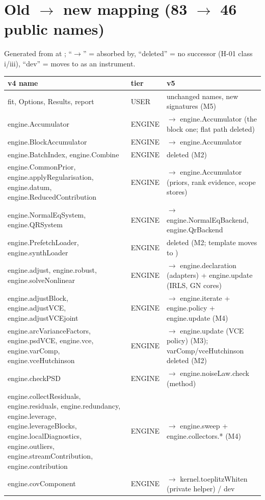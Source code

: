 \appendix
\chapter{Old $\to$ new mapping (83 $\to$ 46 public names)}
\label{app:mapping}

Generated from  at ; ``$\to$'' = absorbed by, ``deleted'' = no successor (H-01 class i/iii), ``dev'' = moves to  as an instrument.

\begin{longtable}{@{}P{72mm}P{14mm}P{68mm}@{}}
\toprule
v4 name & tier & v5\\
\midrule
fit, Options, Results, report & USER & unchanged names, new signatures (M5)\\
engine.Accumulator & ENGINE & $\to$ engine.Accumulator (the block one; flat path deleted)\\
engine.BlockAccumulator & ENGINE & $\to$ engine.Accumulator\\
engine.BatchIndex, engine.Combine & ENGINE & deleted (M2)\\
engine.CommonPrior, engine.applyRegularisation, engine.datum, engine.ReducedContribution & ENGINE & $\to$ engine.Accumulator (priors, rank evidence, scope stores)\\
engine.NormalEqSystem, engine.QRSystem & ENGINE & $\to$ engine.NormalEqBackend, engine.QrBackend\\
engine.PrefetchLoader, engine.synthLoader & ENGINE & deleted (M2; template moves to )\\
engine.adjust, engine.robust, engine.solveNonlinear & ENGINE & $\to$ engine.declaration (adapters) + engine.update (IRLS, GN cores)\\
engine.adjustBlock, engine.adjustVCE, engine.adjustVCEjoint & ENGINE & $\to$ engine.iterate + engine.policy + engine.update (M4)\\
engine.arcVarianceFactors, engine.psdVCE, engine.vce, engine.varComp, engine.vceHutchinson & ENGINE & $\to$ engine.update (VCE policy) (M3); varComp/vceHutchinson deleted (M2)\\
engine.checkPSD & ENGINE & $\to$ engine.noiseLaw.check (method)\\
engine.collectResiduals, engine.residuals, engine.redundancy, engine.leverage, engine.leverageBlocks, engine.localDiagnostics, engine.outliers, engine.streamContribution, engine.contribution & ENGINE & $\to$ engine.sweep + engine.collectors.* (M4)\\
engine.covComponent & ENGINE & $\to$ kernel.toeplitzWhiten (private helper) / dev\\

\end{longtable}
